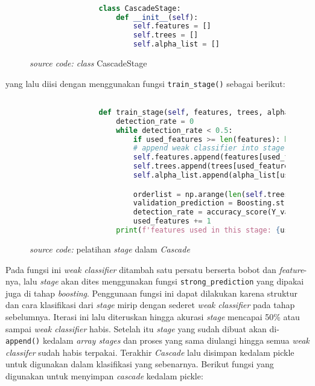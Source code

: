 		\begin{figure}[H]
			\begin{lstlisting}[language=Python, basicstyle=\tiny]

				class CascadeStage:
					def __init__(self):
						self.features = []
						self.trees = []
						self.alpha_list = []

			\end{lstlisting}
			\caption{\emph{source code: class} CascadeStage}
			\label{code: Cascade Class}
		\end{figure}

		yang lalu diisi dengan menggunakan fungsi \texttt{train\_stage()} sebagai berikut:

		\begin{figure}[H]
			\begin{lstlisting}[language=Python, basicstyle=\tiny]

				def train_stage(self, features, trees, alpha_list, X_valid, Y_valid, used_features):
					detection_rate = 0
					while detection_rate < 0.5:
						if used_features >= len(features): break
						# append weak classifier into stage one by one
						self.features.append(features[used_features])
						self.trees.append(trees[used_features])
						self.alpha_list.append(alpha_list[used_features])

						orderlist = np.arange(len(self.trees))
						validation_prediction = Boosting.strong_prediction(self.trees, orderlist, X_valid, self.alpha_list)
						detection_rate = accuracy_score(Y_valid, validation_prediction)
						used_features += 1
					print(f'features used in this stage: {used_features}')

			\end{lstlisting}
			\caption{\emph{source code: } pelatihan \emph{stage} dalam \emph{Cascade}}
			\label{code: train stage function}
		\end{figure}

		Pada fungsi ini \emph{weak classifier} ditambah satu persatu berserta bobot dan 
		\emph{feature}-nya, lalu \emph{stage} akan dites menggunakan fungsi \texttt{strong\_prediction} 
		yang dipakai juga di tahap \emph{boosting}. Penggunaan fungsi ini dapat dilakukan 
		karena struktur dan cara klasifikasi dari \emph{stage} mirip dengan sederet \emph{weak classifier} 
		pada tahap sebelumnya. Iterasi ini lalu diteruskan hingga akurasi \emph{stage} mencapai 50\% 
		atau sampai \emph{weak classifier} habis. Setelah itu \emph{stage} yang sudah dibuat 
		akan di-\texttt{append()} kedalam \textit{array stages} dan proses yang sama diulangi hingga 
		semua \emph{weak classifer} sudah habis terpakai. Terakhir \emph{Cascade} lalu disimpan 
		kedalam pickle untuk digunakan dalam klasifikasi yang sebenarnya. Berikut fungsi yang 
		digunakan untuk menyimpan \emph{cascade} kedalam pickle:

